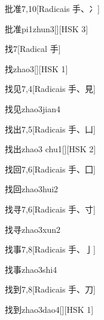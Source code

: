 \begin{entry}{批准}{7,10}[Radicais ⼿、⼎]
  \begin{phonetics}{批准}{pi1zhun3}[][HSK 3]
  \end{phonetics}
\end{entry}

\begin{entry}{找}{7}[Radical ⼿]
  \begin{phonetics}{找}{zhao3}[][HSK 1]
  \end{phonetics}
\end{entry}

\begin{entry}{找见}{7,4}[Radicais ⼿、⾒]
  \begin{phonetics}{找见}{zhao3jian4}
  \end{phonetics}
\end{entry}

\begin{entry}{找出}{7,5}[Radicais ⼿、⼐]
  \begin{phonetics}{找出}{zhao3 chu1}[][HSK 2]
  \end{phonetics}
\end{entry}

\begin{entry}{找回}{7,6}[Radicais ⼿、⼞]
  \begin{phonetics}{找回}{zhao3hui2}
  \end{phonetics}
\end{entry}

\begin{entry}{找寻}{7,6}[Radicais ⼿、⼨]
  \begin{phonetics}{找寻}{zhao3xun2}
  \end{phonetics}
\end{entry}

\begin{entry}{找事}{7,8}[Radicais ⼿、⼅]
  \begin{phonetics}{找事}{zhao3shi4}
  \end{phonetics}
\end{entry}

\begin{entry}{找到}{7,8}[Radicais ⼿、⼑]
  \begin{phonetics}{找到}{zhao3dao4}[][HSK 1]
  \end{phonetics}
\end{entry}

